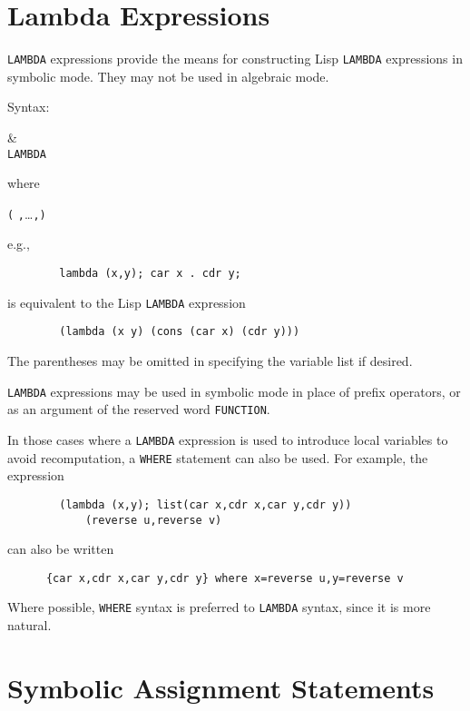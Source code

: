 \section{Lambda Expressions}
\hypertarget{reserved:LAMBDA}{}
\label{sec-lambda}

\texttt{LAMBDA} expressions provide the means for constructing Lisp \texttt{LAMBDA}
expressions in symbolic mode. They may not be used in algebraic mode.

Syntax:
\begin{syntaxtable}
      \bnfprod& \\
        \qquad \texttt{LAMBDA } 
\end{syntaxtable}
 where
\begin{syntax}
     \texttt{(} \texttt{,}\dots\texttt{,}\texttt{)}
\end{syntax}
e.g.,
\begin{verbatim}
        lambda (x,y); car x . cdr y;
\end{verbatim}
is equivalent to the Lisp \texttt{LAMBDA} expression
\begin{verbatim}
        (lambda (x y) (cons (car x) (cdr y)))
\end{verbatim}
The parentheses may be omitted in specifying the variable list if desired.

\texttt{LAMBDA} expressions may be used in symbolic mode in place of prefix
operators, or as an argument of the reserved word \texttt{FUNCTION}.

In those cases where a \texttt{LAMBDA} expression is used to introduce local
variables to avoid recomputation, a \texttt{WHERE} statement can also be
used.  For example, the expression
\begin{verbatim}
        (lambda (x,y); list(car x,cdr x,car y,cdr y))
            (reverse u,reverse v)
\end{verbatim}
can also be written
\begin{verbatim}
      {car x,cdr x,car y,cdr y} where x=reverse u,y=reverse v
\end{verbatim}
Where possible, \texttt{WHERE} syntax is preferred to \texttt{LAMBDA} syntax,
since it is more natural.

\section{Symbolic Assignment Statements}
\hypertarget{command:SETQ}{}

